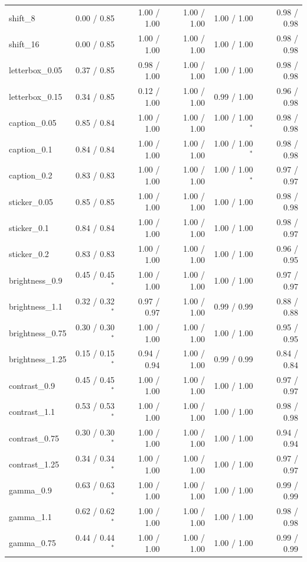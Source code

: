 \begin{tabular}{lrrrrr}
shift\_8 & 0.00 / 0.85 & 1.00 / 1.00 & 1.00 / 1.00 & 1.00 / 1.00 & 0.98 / 0.98 \\
shift\_16 & 0.00 / 0.85 & 1.00 / 1.00 & 1.00 / 1.00 & 1.00 / 1.00 & 0.98 / 0.98 \\
letterbox\_0.05 & 0.37 / 0.85 & 0.98 / 1.00 & 1.00 / 1.00 & 1.00 / 1.00 & 0.98 / 0.98 \\
letterbox\_0.15 & 0.34 / 0.85 & 0.12 / 1.00 & 1.00 / 1.00 & 0.99 / 1.00 & 0.96 / 0.98 \\
caption\_0.05 & 0.85 / 0.84 & 1.00 / 1.00 & 1.00 / 1.00 & 1.00 / 1.00$^*$ & 0.98 / 0.98 \\
caption\_0.1 & 0.84 / 0.84 & 1.00 / 1.00 & 1.00 / 1.00 & 1.00 / 1.00$^*$ & 0.98 / 0.98 \\
caption\_0.2 & 0.83 / 0.83 & 1.00 / 1.00 & 1.00 / 1.00 & 1.00 / 1.00$^*$ & 0.97 / 0.97 \\
sticker\_0.05 & 0.85 / 0.85 & 1.00 / 1.00 & 1.00 / 1.00 & 1.00 / 1.00 & 0.98 / 0.98 \\
sticker\_0.1 & 0.84 / 0.84 & 1.00 / 1.00 & 1.00 / 1.00 & 1.00 / 1.00 & 0.98 / 0.97 \\
sticker\_0.2 & 0.83 / 0.83 & 1.00 / 1.00 & 1.00 / 1.00 & 1.00 / 1.00 & 0.96 / 0.95 \\
brightness\_0.9 & 0.45 / 0.45$^*$ & 1.00 / 1.00 & 1.00 / 1.00 & 1.00 / 1.00 & 0.97 / 0.97 \\
brightness\_1.1 & 0.32 / 0.32$^*$ & 0.97 / 0.97 & 1.00 / 1.00 & 0.99 / 0.99 & 0.88 / 0.88 \\
brightness\_0.75 & 0.30 / 0.30$^*$ & 1.00 / 1.00 & 1.00 / 1.00 & 1.00 / 1.00 & 0.95 / 0.95 \\
brightness\_1.25 & 0.15 / 0.15$^*$ & 0.94 / 0.94 & 1.00 / 1.00 & 0.99 / 0.99 & 0.84 / 0.84 \\
contrast\_0.9 & 0.45 / 0.45$^*$ & 1.00 / 1.00 & 1.00 / 1.00 & 1.00 / 1.00 & 0.97 / 0.97 \\
contrast\_1.1 & 0.53 / 0.53$^*$ & 1.00 / 1.00 & 1.00 / 1.00 & 1.00 / 1.00 & 0.98 / 0.98 \\
contrast\_0.75 & 0.30 / 0.30$^*$ & 1.00 / 1.00 & 1.00 / 1.00 & 1.00 / 1.00 & 0.94 / 0.94 \\
contrast\_1.25 & 0.34 / 0.34$^*$ & 1.00 / 1.00 & 1.00 / 1.00 & 1.00 / 1.00 & 0.97 / 0.97 \\
gamma\_0.9 & 0.63 / 0.63$^*$ & 1.00 / 1.00 & 1.00 / 1.00 & 1.00 / 1.00 & 0.99 / 0.99 \\
gamma\_1.1 & 0.62 / 0.62$^*$ & 1.00 / 1.00 & 1.00 / 1.00 & 1.00 / 1.00 & 0.98 / 0.98 \\
gamma\_0.75 & 0.44 / 0.44$^*$ & 1.00 / 1.00 & 1.00 / 1.00 & 1.00 / 1.00 & 0.99 / 0.99 \\

\end{tabular}
